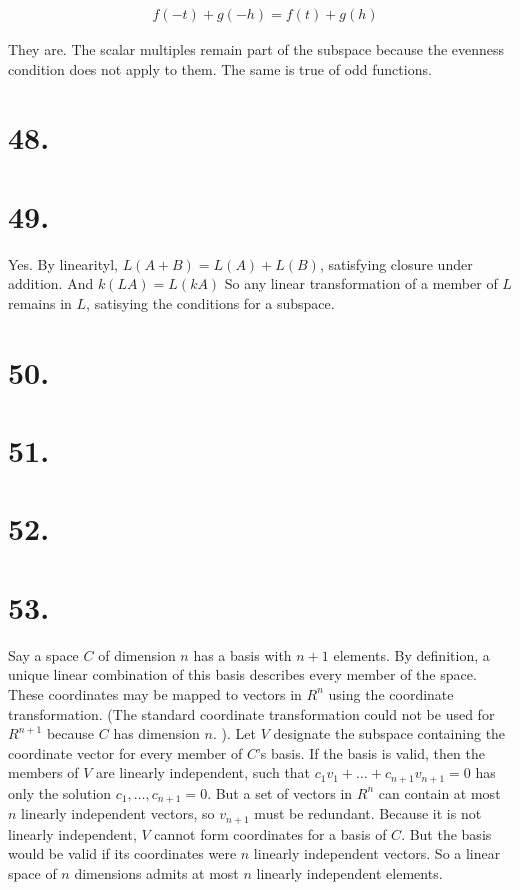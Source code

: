 \documentclass[]{article}
\begin{document}
{\[
  \begin{aligned}
    & f(-t) +g(-h) = f(t) + g(h)  
  \end{aligned}
\]

They are. The scalar multiples remain part of the subspace because the
evenness condition does not apply to them. The same is true of odd
functions.

\hypertarget{section-44}{%
\section{48.}\label{section-44}}

\hypertarget{section-45}{%
\section{49.}\label{section-45}}

Yes. By linearityl, \(L(A +B) = L(A) + L(B)\), satisfying closure under
addition. And \(k(LA) = L(kA)\) So any linear transformation of a member
of \(L\) remains in \(L\), satisying the conditions for a subspace.

\hypertarget{section-46}{%
\section{50.}\label{section-46}}

\hypertarget{section-47}{%
\section{51.}\label{section-47}}

\hypertarget{section-48}{%
\section{52.}\label{section-48}}

\hypertarget{section-49}{%
\section{53.}\label{section-49}}

Say a space \(C\) of dimension \(n\) has a basis with \(n+1\) elements.
By definition, a unique linear combination of this basis describes every
member of the space. These coordinates may be mapped to vectors in
\(R^n\) using the coordinate transformation. (The standard coordinate
transformation could not be used for \(R^{n+1}\) because \(C\) has
dimension \(n\). ). Let \(V\) designate the subspace containing the
coordinate vector for every member of \(C\)'s basis. If the basis is
valid, then the members of \(V\) are linearly independent, such that
\(c_1v_1+\dots+c_{n+1}v_{n+1}=0\) has only the solution
\(c_1,\dots,c_{n+1}=0\). But a set of vectors in \(R^n\) can contain at
most \(n\) linearly independent vectors, so \(v_{n+1}\) must be
redundant. Because it is not linearly independent, \(V\) cannot form
coordinates for a basis of \(C\). But the basis would be valid if its
coordinates were \(n\) linearly independent vectors. So a linear space
of \(n\) dimensions admits at most \(n\) linearly independent elements.

}
\end{document}
